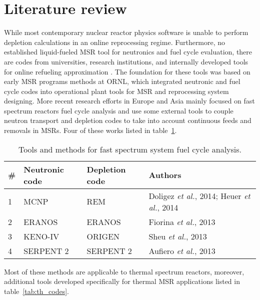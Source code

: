 \section{Literature review}
While most contemporary nuclear reactor physics software is unable to perform depletion calculations in an online reprocessing regime. Furthermore, no established liquid-fueled \gls{MSR} tool for neutronics and fuel cycle evaluation, there are codes from universities, research institutions, and internally developed tools for online refueling approximation \cite{serp_molten_2014}. The foundation for these tools was based on early \gls{MSR} programs  methods at \gls{ORNL}, which integrated neutronic and fuel cycle codes \cite{bauman_rod:_1971} into operational plant tools \cite{kee_mrpp:_1976} for \gls{MSR} and reprocessing system designing. More recent research efforts in Europe and Asia mainly focused on fast spectrum reactors fuel cycle analysis and use some external tools to couple neutron transport and depletion codes to take into account continuous feeds and removals in \glspl{MSR}. Four of these works listed in table~\ref{tab:fs_codes}.

\begin{table}[h!]
\centering
\caption{Tools and methods for fast spectrum system fuel cycle analysis.}
\begin{tabular}{ |m{}|m{}|m{}|m{}|} 
\hline
\# & Neutronic code  & Depletion code    & Authors         \\[5pt]
\hline
1 & \gls{MCNP} \cite{noauthor_mcnp_2004}      & REM \cite{heuer_simulation_2010}  & Doligez \emph{et al.}, 2014; Heuer \emph{et al.}, 2014 \cite{doligez_coupled_2014,heuer_towards_2014}    \\[5pt]
\hline
2 & ERANOS \cite{ruggieri_eranos_2006}      & ERANOS     & Fiorina \emph{et al.}, 2013 \cite{fiorina_investigation_2013}\\[5pt]
\hline
3 & KENO-IV \cite{goluoglu_monte_2011}     & ORIGEN \cite{gauld_isotopic_2011}     & Sheu \emph{et al.}, 2013 \cite{sheu_depletion_2013} \\[5pt]
\hline
4 & SERPENT 2 \cite{leppanen_serpent_2015}   & SERPENT 2  & Aufiero \emph{et al.}, 2013 \cite{aufiero_extended_2013} \\[5pt]
\hline
\end{tabular}
  \label{tab:fs_codes}
\end{table}

Most of these methods are applicable to thermal spectrum reactors, moreover, additional tools developed specifically for thermal \gls{MSR} applications listed in table~\ref{tab:th_codes}.

